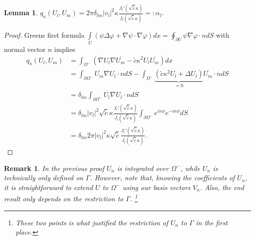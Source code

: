 \documentclass[10pt,journal,compsoc, onecolumn]{IEEEtran}
\newtheorem{lemma}[theorem]{Lemma}
\newtheorem{remark}[theorem]{Remark}
\begin{document}
\begin{lemma}
    $q_\kappa(U_l, U_m) = 2 \pi  \delta_{lm}|v_l|^2\kappa  \frac{J_l'(\sqrt{ \tilde c}\kappa )}{J_l(\sqrt{ \tilde c}\kappa )} =: \alpha_l$.
\end{lemma}
\begin{proof}
    Greens first formula 
    \(\int\limits_{U}(\psi \Delta \varphi+\nabla \psi \cdot \nabla \varphi) dx=\oint_{\partial U} \psi \nabla \varphi \cdot n dS\) with normal vector $n$
    implies 
\begin{align}
    q_\kappa(U_l, U_m) &= \int_{\Omega^-} ( \nabla U_l \nabla \overline{U_m} -  \tilde c\kappa^2U_l \overline{U_m})dx \nonumber \\
        &= \int_{ \partial \Omega^-} \overline{U_m} \nabla U_l \cdot nd {S} - \int_{\Omega^{-}} \underbrace{( \tilde c\kappa^2 U_l + \Delta U_l)}_{=0} \overline{U_m} \cdot nd{S}  \nonumber \\
        &= \delta_{lm}\int_{ \partial \Omega^-} \overline{U_l} \nabla U_l \cdot nd {S} \nonumber \\
        &= \delta_{lm}|v_l|^2 \sqrt{ \tilde c} \kappa  \frac{J_l'(\sqrt{ \tilde c}\kappa )}{J_l(\sqrt{ \tilde c}\kappa )}
          \int_{\partial \Omega^-} e^{in\phi}  e^{-in\phi} dS \nonumber \\
        &= \delta_{lm}2\pi |v_l|^2\kappa \sqrt{ \tilde c} \frac{J_l'(\sqrt{ \tilde c} \kappa )}{J_l(\sqrt{ \tilde c}\kappa )}.\nonumber
\end{align}
\end{proof}

\begin{remark}
    In the previous proof $U_n$ is integrated over $\Omega^-$, while $U_n$ is technically only defined on $\Gamma$. 
    However, note that, knowing the coefficients of $U_n$, it is straightforward to extend $U$ to $\Omega^-$ using our basis vectors $V_n$. 
    Also, the end result only depends on the restriction to $\Gamma$.
    \footnote{These two points is what justified the restriction of $U_n$ to $\Gamma$ in the first place.}
\end{remark}
\end{document}

